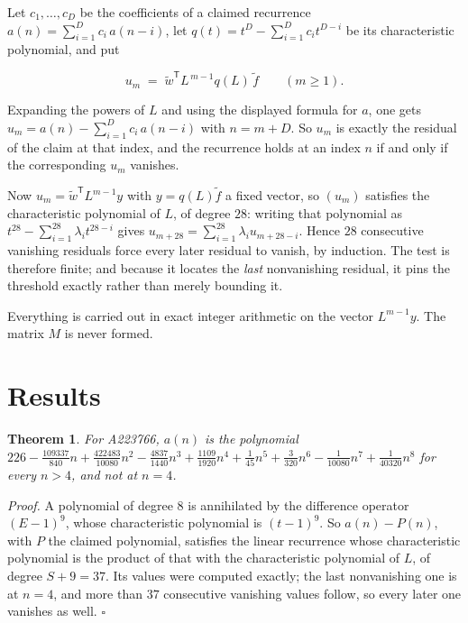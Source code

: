 \documentclass[11pt]{article}
\newtheorem{theorem}{Theorem}
\theoremstyle{definition}
\begin{document}
Let $c_1,\dots,c_D$ be the coefficients of a claimed recurrence $a(n) = \sum_{i=1}^{D} c_i\,a(n-i)$, let $q(t) = t^{D} - \sum_{i=1}^{D} c_i t^{D-i}$ be its characteristic polynomial, and put

\[u_m \;=\; \tilde w^{\mathsf T} L^{\,m-1} q(L)\,\tilde f \qquad (m \ge 1).\]

Expanding the powers of $L$ and using the displayed formula for $a$, one gets $u_m = a(n) - \sum_{i=1}^{D} c_i\,a(n-i)$ with $n = m + D$. So $u_m$ is exactly the residual of the claim at that index, and the recurrence holds at an index $n$ if and only if the corresponding $u_m$ vanishes.

Now $u_m = \tilde w^{\mathsf T} L^{m-1} y$ with $y = q(L)\tilde f$ a fixed vector, so $(u_m)$ satisfies the characteristic polynomial of $L$, of degree $28$: writing that polynomial as $t^{28} - \sum_{i=1}^{28} \lambda_i t^{28-i}$ gives $u_{m+28} = \sum_{i=1}^{28} \lambda_i u_{m+28-i}$. Hence $28$ consecutive vanishing residuals force every later residual to vanish, by induction. The test is therefore finite; and because it locates the {\itshape last} nonvanishing residual, it pins the threshold exactly rather than merely bounding it.

Everything is carried out in exact integer arithmetic on the vector $L^{m-1}y$. The matrix $M$ is never formed.

\section{Results}

\begin{theorem} For A223766, $a(n)$ is the polynomial $226 - \frac{109337}{840}n + \frac{422483}{10080}n^{2} - \frac{4837}{1440}n^{3} + \frac{1109}{1920}n^{4} + \frac{1}{45}n^{5} + \frac{3}{320}n^{6} - \frac{1}{10080}n^{7} + \frac{1}{40320}n^{8}$ for every $n > 4$, and not at $n = 4$.\end{theorem}

{\itshape Proof.} A polynomial of degree $8$ is annihilated by the difference operator $(E-1)^{9}$, whose characteristic polynomial is $(t-1)^{9}$. So $a(n) - P(n)$, with $P$ the claimed polynomial, satisfies the linear recurrence whose characteristic polynomial is the product of that with the characteristic polynomial of $L$, of degree $S + 9 = 37$. Its values were computed exactly; the last nonvanishing one is at $n = 4$, and more than $37$ consecutive vanishing values follow, so every later one vanishes as well. $\square$
\end{document}

